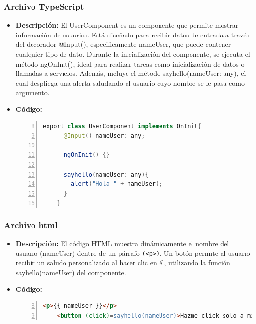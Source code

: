 \documentclass{article}
\begin{document}
  \subsubsection{Archivo TypeScript}
  \begin{itemize}
    \item \textbf{Descripción: }El UserComponent es un componente que permite mostrar información de usuarios. 
    Está diseñado para recibir datos de entrada a través del decorador @Input(), especificamente nameUser, 
    que puede contener cualquier tipo de dato. Durante la inicialización del componente, se ejecuta el método 
    ngOnInit(), ideal para realizar tareas como inicialización de datos o llamadas a servicios. Además, 
    incluye el método sayhello(nameUser: any), el cual despliega una alerta saludando al usuario cuyo nombre 
    se le pasa como argumento.
    \item \textbf{Código: }
    \begin{lstlisting}[language=java, numbers=left, firstnumber=8, numberstyle=\color{black}]
    export class UserComponent implements OnInit{
      @Input() nameUser: any;
      
      ngOnInit() {}
      
      sayhello(nameUser: any){
        alert("Hola " + nameUser);
      }
    }
    \end{lstlisting}
  \end{itemize}
  \subsubsection{Archivo html}
  \begin{itemize}
    \item \textbf{Descripción: }El código HTML muestra dinámicamente el nombre del usuario (nameUser) 
    dentro de un párrafo \verb|(<p>)|. Un botón permite al usuario recibir un saludo personalizado al hacer clic en él, 
    utilizando la función sayhello(nameUser) del componente.
    \newpage
    \item \textbf{Código: }
    \begin{lstlisting}[language=html, numbers=left, firstnumber=8, numberstyle=\color{orange}]
    <p>{{ nameUser }}</p>
    <button (click)=sayhello(nameUser)>Hazme click solo a mi</button>
    \end{lstlisting}
  \end{itemize}

\end{document}
